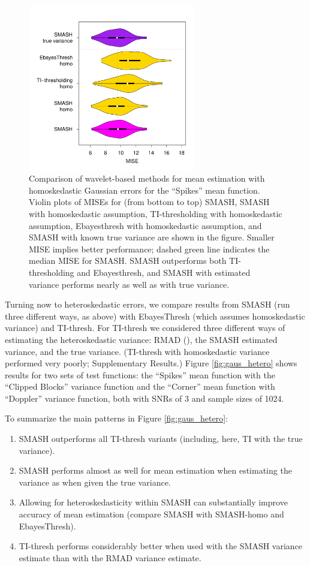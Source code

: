 \documentclass[12pt]{article}
\begin{document}
\begin{figure}
\centering
    \includegraphics[width=0.65\textwidth]{violin_gaus_homo.pdf}
    \caption{Comparison of wavelet-based methods for mean estimation with homoskedastic Gaussian errors for the ``Spikes'' mean function. Violin plots of MISEs for (from bottom to top) SMASH, SMASH with homoskedastic assumption, TI-thresholding with homoskedastic assumption, Ebayesthresh with homoskedastic assumption, and SMASH with known true variance are shown in the figure. Smaller MISE implies better performance; dashed green line indicates the median MISE for SMASH. SMASH outperforms both TI-thresholding and Ebayesthresh, and SMASH with estimated variance performs nearly as well as with true variance.}
    \label{fig:gaus_homo}
\end{figure}

Turning now to heteroskedastic errors, we compare results from SMASH (run three different ways, as above) with EbayesThresh (which assumes
homoskedastic variance) and TI-thresh. For TI-thresh we considered three different ways of estimating the heteroskedastic variance: RMAD 
(\cite{Gao1997Wavelet}), the SMASH estimated variance, and the true variance. (TI-thresh with homoskedastic variance performed very poorly; Supplementary Results.) Figure \ref{fig:gaus_hetero} 
shows results for two sets of test functions: the ``Spikes'' mean function with the ``Clipped Blocks'' variance function and the ``Corner'' mean function with ``Doppler'' variance function, both with SNRs of 3 and sample sizes of 1024. 

To summarize the main patterns in Figure \ref{fig:gaus_hetero}:
\begin{enumerate}
\item SMASH outperforms all TI-thresh variants (including, here, TI with the true variance).
\item SMASH performs almost as well for mean estimation when estimating the variance as when given the true variance.
\item Allowing for heteroskedasticity within SMASH can substantially improve accuracy of mean estimation (compare SMASH with SMASH-homo and EbayesThresh).
\item TI-thresh performs considerably better when used with the SMASH variance estimate than with the RMAD variance estimate.
\end{enumerate}
\end{document}
